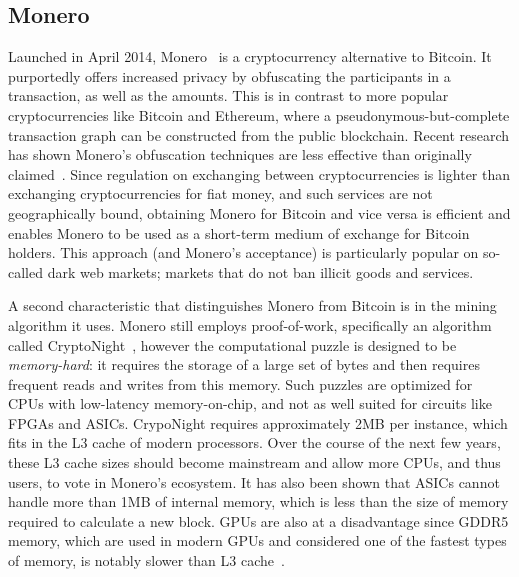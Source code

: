 \subsection{Monero}

Launched in April 2014, Monero~\cite{monero} is a cryptocurrency alternative to Bitcoin. It purportedly offers increased privacy by obfuscating the participants in a transaction, as well as the amounts. This is in contrast to more popular cryptocurrencies like Bitcoin and Ethereum, where a pseudonymous-but-complete transaction graph can be constructed from the public blockchain. Recent research has shown Monero's obfuscation techniques are less effective than originally claimed~\cite{MMLN17}.  Since regulation on exchanging between cryptocurrencies is lighter than exchanging cryptocurrencies for fiat money, and such services are not geographically bound, obtaining Monero for Bitcoin and vice versa is efficient and enables Monero to be used as a short-term medium of exchange for Bitcoin holders. This approach (and Monero's acceptance) is particularly popular on so-called dark web markets; markets that do not ban illicit goods and services.

A second characteristic that distinguishes Monero from Bitcoin is in the mining algorithm it uses. Monero still employs proof-of-work, specifically an algorithm called CryptoNight~\cite{cryptoknight}, however the computational puzzle is designed to be \textit{memory-hard}: it requires the storage of a large set of bytes and then requires frequent reads and writes from this memory. Such puzzles are optimized for CPUs with low-latency memory-on-chip, and not as well suited for circuits like FPGAs and ASICs. CrypoNight requires approximately 2MB per instance, which fits in the L3 cache of modern processors. Over the course of the next few years, these L3 cache sizes should become mainstream and allow more CPUs, and thus users, to vote in Monero's ecosystem. It has also been shown that ASICs cannot handle more than 1MB of internal memory, which is less than the size of memory required to calculate a new block. GPUs are also at a disadvantage since GDDR5 memory, which are used in modern GPUs and considered one of the fastest types of memory, is notably slower than L3 cache~\cite{van2013cryptonote}.  

%
%
%
%
%
%

